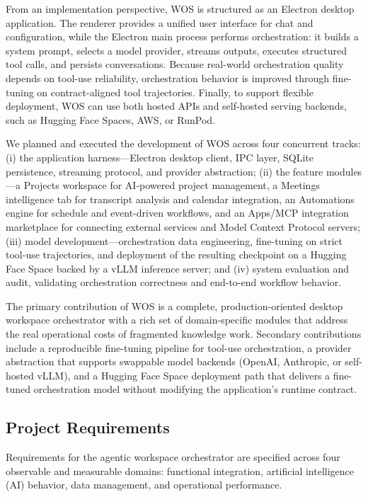 \documentclass[conference]{IEEEtran}
\begin{document}
From an implementation perspective, WOS is structured as an Electron desktop application. The renderer provides a unified user interface for chat and configuration, while the Electron main process performs orchestration: it builds a system prompt, selects a model provider, streams outputs, executes structured tool calls, and persists conversations. Because real-world orchestration quality depends on tool-use reliability, orchestration behavior is improved through fine-tuning on contract-aligned tool trajectories. Finally, to support flexible deployment, WOS can use both hosted APIs and self-hosted serving backends, such as Hugging Face Spaces, AWS, or RunPod.

We planned and executed the development of WOS across four concurrent tracks: (i) the application harness---Electron desktop client, IPC layer, SQLite persistence, streaming protocol, and provider abstraction; (ii) the feature modules---a Projects workspace for AI-powered project management, a Meetings intelligence tab for transcript analysis and calendar integration, an Automations engine for schedule and event-driven workflows, and an Apps/MCP integration marketplace for connecting external services and Model Context Protocol servers; (iii) model development---orchestration data engineering, fine-tuning on strict tool-use trajectories, and deployment of the resulting checkpoint on a Hugging Face Space backed by a vLLM inference server; and (iv) system evaluation and audit, validating orchestration correctness and end-to-end workflow behavior.

The primary contribution of WOS is a complete, production-oriented desktop workspace orchestrator with a rich set of domain-specific modules that address the real operational costs of fragmented knowledge work. Secondary contributions include a reproducible fine-tuning pipeline for tool-use orchestration, a provider abstraction that supports swappable model backends (OpenAI, Anthropic, or self-hosted vLLM), and a Hugging Face Space deployment path that delivers a fine-tuned orchestration model without modifying the application's runtime contract.

\subsection{Project Requirements}
Requirements for the agentic workspace orchestrator are specified across four observable and measurable domains: functional integration, artificial intelligence (AI) behavior, data management, and operational performance.
\end{document}

